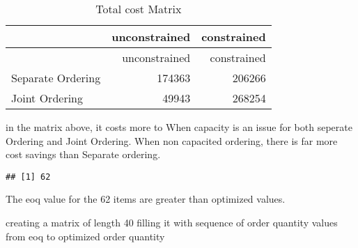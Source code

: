 \documentclass[
]{article}
\newenvironment{Shaded}{\begin{snugshade}}{\end{snugshade}}
\newcommand{\CommentTok}[1]{\textcolor[rgb]{0.56,0.35,0.01}{\textit{#1}}}
\newcommand{\ControlFlowTok}[1]{\textcolor[rgb]{0.13,0.29,0.53}{\textbf{#1}}}
\newcommand{\DecValTok}[1]{\textcolor[rgb]{0.00,0.00,0.81}{#1}}
\newcommand{\KeywordTok}[1]{\textcolor[rgb]{0.13,0.29,0.53}{\textbf{#1}}}
\newcommand{\NormalTok}[1]{#1}
\newcommand{\OperatorTok}[1]{\textcolor[rgb]{0.81,0.36,0.00}{\textbf{#1}}}
\newcommand{\StringTok}[1]{\textcolor[rgb]{0.31,0.60,0.02}{#1}}
\begin{document}
\begin{longtable}[]{@{}lrr@{}}
\caption{Total cost Matrix}\tabularnewline
\toprule
& unconstrained & constrained\tabularnewline
\midrule
\endfirsthead
\toprule
& unconstrained & constrained\tabularnewline
\midrule
\endhead
Separate Ordering & 174363 & 206266\tabularnewline
Joint Ordering & 49943 & 268254\tabularnewline
\bottomrule
\end{longtable}

in the matrix above, it costs more to When capacity is an issue for both
seperate Ordering and Joint Ordering. When non capacited ordering, there
is far more cost savings than Separate ordering.

\begin{Shaded}
\end{Shaded}

\begin{verbatim}
## [1] 62
\end{verbatim}

The eoq value for the 62 items are greater than optimized values.

creating a matrix of length 40 filling it with sequence of order
quantity values from eoq to optimized order quantity
\end{document}
